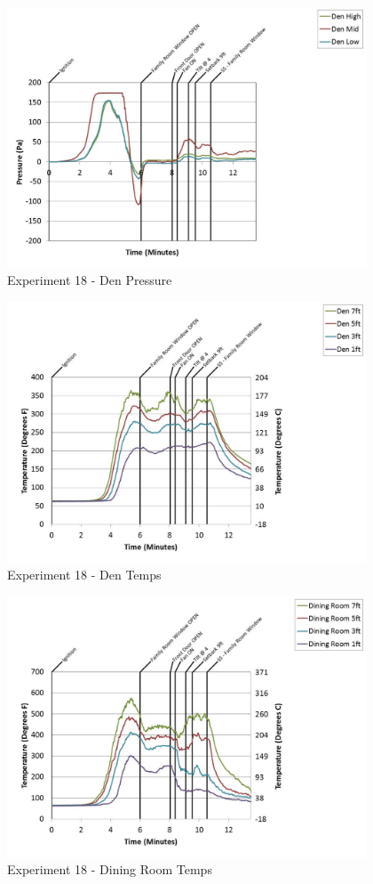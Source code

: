 \documentclass{article}
\begin{document}
\begin{appendices}
	\clearpage

	\begin{figure}[h!]
		\centering
		\includegraphics[height=3.05in]{0_Images/Results_Charts/Exp_18_Charts/DenPressure.pdf}
		\caption{Experiment 18 - Den Pressure}
	\end{figure}
 

	\begin{figure}[h!]
		\centering
		\includegraphics[height=3.05in]{0_Images/Results_Charts/Exp_18_Charts/DenTemps.pdf}
		\caption{Experiment 18 - Den Temps}
	\end{figure}
 
	\clearpage

	\begin{figure}[h!]
		\centering
		\includegraphics[height=3.05in]{0_Images/Results_Charts/Exp_18_Charts/DiningRoomTemps.pdf}
		\caption{Experiment 18 - Dining Room Temps}
	\end{figure}
 


\end{appendices}
\end{document}
